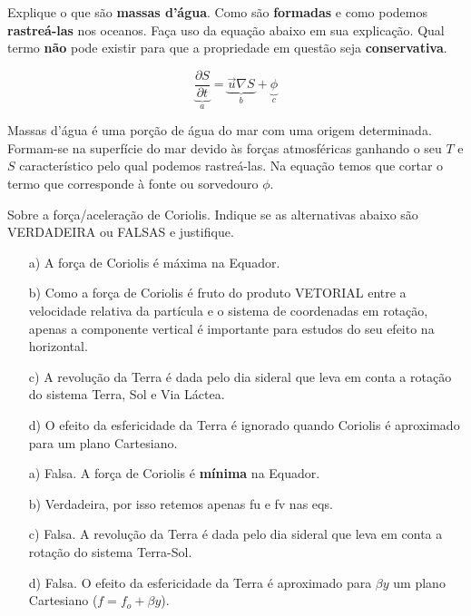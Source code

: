 \documentclass[letterpaper,portuguese,12pt,pdftex]{exam}
\newcommand{\pd}[2]{\frac{\partial #1}{\partial #2}}
\begin{document}
\begin{questions}

\question[5]
Explique o que são {\bf massas d'água}.  Como são {\bf formadas} e como podemos
{\bf rastreá-las} nos oceanos.  Faça uso da equação abaixo em sua explicação.
Qual termo {\bf não} pode existir para que a propriedade em questão seja
{\bf conservativa}.

\[
  \underbrace{\pd{S}{t}}_a = \underbrace{\vec{u}\nabla S}_b + \underbrace{\phi}_c
\]

\begin{solution}
 Massas d'água é uma porção de água do mar com uma origem determinada.
 Formam-se na superfície do mar devido às forças atmosféricas ganhando o seu $T$
 e $S$ característico pelo qual podemos rastreá-las.  Na equação temos que
 cortar o termo que corresponde à fonte ou sorvedouro $\phi$.
\end{solution}


\question[3]
Sobre a força/aceleração de Coriolis.  Indique se as alternativas abaixo são
VERDADEIRA ou FALSAS e justifique.
\begin{itemize}
  \item[a)] A força de Coriolis é máxima na Equador.
  \item[b)] Como a força de Coriolis é fruto do produto VETORIAL entre a velocidade
        relativa da partícula e o sistema de coordenadas em rotação, apenas a
        componente vertical é importante para estudos do seu efeito na
        horizontal.
  \item[c)] A revolução da Terra é dada pelo dia sideral que leva em conta a rotação
        do sistema Terra, Sol e Via Láctea.
  \item[d)] O efeito da esfericidade da Terra é ignorado quando Coriolis é
  aproximado para um plano Cartesiano.
\end{itemize}

\begin{solution}
\begin{itemize}
  \item[a)] Falsa. A força de Coriolis é {\bf mínima} na Equador.
  \item[b)] Verdadeira, por isso retemos apenas fu e fv nas eqs.
  \item[c)] Falsa. A revolução da Terra é dada pelo dia sideral que leva em
            conta a rotação do sistema Terra-Sol.
  \item[d)] Falsa. O efeito da esfericidade da Terra é aproximado para $\beta y$
            um plano Cartesiano ($f = f_o + \beta y$).
\end{itemize}
\end{solution}




\end{questions}
\end{document}
